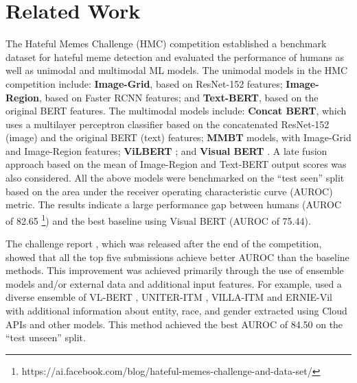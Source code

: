 \documentclass[11pt]{article}
\begin{document}
\section{Related Work}
\label{sec:rel}

The Hateful Memes Challenge (HMC) competition \citep{kiela2020hateful} established a benchmark dataset for hateful meme detection and evaluated the performance of humans as well as unimodal and multimodal ML models. The unimodal models in the HMC competition include: \textbf{Image-Grid}, based on ResNet-152 \citep{he2016deep} features; \textbf{Image-Region}, based on Faster RCNN \citep{ren2017faster} features; and \textbf{Text-BERT}, based on the original BERT \cite{devlin2018bert} features. The multimodal models include: \textbf{Concat BERT}, which uses a multilayer perceptron classifier based on the concatenated ResNet-152 (image) and the original BERT (text) features; \textbf{MMBT} \citep{kiela2019supervised} models, with Image-Grid and Image-Region features; \textbf{ViLBERT} \citep{lu2019vilbert}; and \textbf{Visual BERT} \citep{li2019visualbert}. A late fusion approach based on the mean of Image-Region and Text-BERT output scores was also considered. All the above models were benchmarked on the ``test seen'' split  based on the area under the receiver operating characteristic curve (AUROC) \citep{BRADLEY19971145} metric. The results indicate a large performance gap between humans (AUROC of 82.65 \footnote{https://ai.facebook.com/blog/hateful-memes-challenge-and-data-set/}) and the best baseline using Visual BERT (AUROC of 75.44).

The challenge report \citep{pmlr-v133-kiela21a}, which was released after the end of the competition, showed that all the top five submissions \citep{zhu2020enhance, muennighoff2020vilio, velioglu2020detecting, lippe2020multimodal, s2020detecting} achieve better AUROC than the baseline methods. This improvement was achieved primarily through the use of ensemble models and/or external data and additional input features. For example, \citet{zhu2020enhance} used a diverse ensemble of VL-BERT \citep{su2019vlbert}, UNITER-ITM \citep{chen2019uniter}, VILLA-ITM \citep{gan2020largescale} and ERNIE-Vil \citep{yu2020ernievil} with additional information about entity, race, and gender extracted using Cloud APIs and other models. This method achieved the best AUROC of 84.50 on the ``test unseen'' split. 
\end{document}
